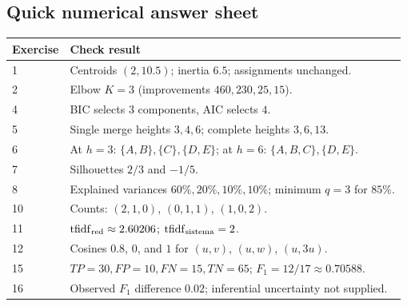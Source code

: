 \subsection{Quick numerical answer sheet}
\begin{center}\small
\begin{tabularx}{\textwidth}{@{}lX@{}}\toprule
Exercise&Check result\\\midrule
1&Centroids $(2,10.5)$; inertia $6.5$; assignments unchanged.\\
2&Elbow $K=3$ (improvements $460,230,25,15$).\\
4&BIC selects $3$ components, AIC selects $4$.\\
5&Single merge heights $3,4,6$; complete heights $3,6,13$.\\
6&At $h=3$: $\{A,B\},\{C\},\{D,E\}$; at $h=6$: $\{A,B,C\},\{D,E\}$.\\
7&Silhouettes $2/3$ and $-1/5$.\\
8&Explained variances $60\%,20\%,10\%,10\%$; minimum $q=3$ for $85\%$.\\
10&Counts: $(2,1,0)$, $(0,1,1)$, $(1,0,2)$.\\
11&$\mathrm{tfidf}_{\rm red}\approx2.60206$; $\mathrm{tfidf}_{\rm sistema}=2$.\\
12&Cosines $0.8$, $0$, and $1$ for $(u,v)$, $(u,w)$, $(u,3u)$.\\
15&$TP=30,FP=10,FN=15,TN=65$; $F_1=12/17\approx0.70588$.\\
16&Observed $F_1$ difference $0.02$; inferential uncertainty not supplied.\\\bottomrule
\end{tabularx}
\end{center}
